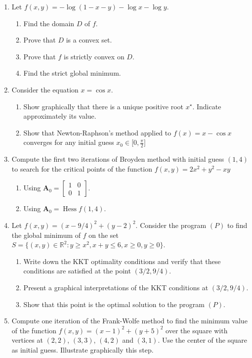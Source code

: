 \documentclass[11pt]{article}
\theoremstyle{definition}
\begin{document}
\begin{enumerate}
  \item Let $f(x,y) = -\log(1-x-y)-\log x -\log y$.
  \begin{enumerate}
    \item Find the domain $D$ of $f$.
    \item Prove that $D$ is a convex set.
    \item Prove that $f$ is strictly convex on $D$.
    \item Find the strict global minimum.
\end{enumerate}
\item Consider the equation $x=\cos x$. 
\begin{enumerate}
    \item Show graphically that there is a unique positive root $x^\star$. Indicate approximately its value.
    \item Show that Newton-Raphson's method applied to $f(x)=x-\cos x$ converges for any initial guess $x_0 \in \big[0, \tfrac{\pi}{2}\big]$
\end{enumerate}
\item Compute the first two iterations of Broyden method with initial guess $(1,4)$ to search for the critical points of the function $f(x,y) = 2x^2+y^2-xy$
\begin{enumerate}
    \item Using $\boldsymbol{A}_0 = \begin{bmatrix} 1 & 0 \\ 0 & 1 \end{bmatrix}$.
    \item Using $\boldsymbol{A}_0 = \operatorname{Hess} f(1,4)$.
\end{enumerate}
\item Let $f(x,y) = (x-9/4)^2+(y-2)^2$.  Consider the program $(P)$ to find the global minimum of $f$ on the set $S= \{ (x,y) \in \mathbb{R}^2 : y \geq x^2, x+y \leq 6, x \geq 0, y \geq 0 \}$.
\begin{enumerate}
\item Write down the KKT optimality conditions and verify that these conditions are satisfied at the point $(3/2, 9/4)$.
\item Present a graphical interpretations of the KKT conditions at $(3/2, 9/4)$.
\item Show that this point is the optimal solution to the program $(P)$.
\end{enumerate}
\item Compute one iteration of the Frank-Wolfe method to find the minimum value of the function $f(x,y) = (x-1)^2 + (y+5)^2$ over the square with vertices at $(2,2)$, $(3,3)$, $(4,2)$ and $(3,1)$.  Use the center of the square as initial guess.  Illustrate graphically this step. 
\end{enumerate}
\end{document}
